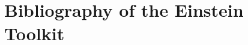 \documentclass[12pt, tightenlines]{revtex4}
\begin{document}
\section*{Bibliography of the Einstein Toolkit}
\nocite{*}


\end{document}
